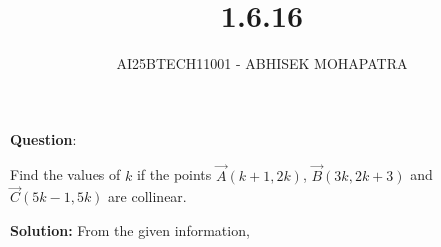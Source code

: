 \documentclass[journal,12pt,onecolumn]{IEEEtran}
\begin{document}
\title{1.6.16}
\author{AI25BTECH11001 - ABHISEK MOHAPATRA}
{\let\newpage\relax\maketitle}
		\textbf{Question}:

		\noindent Find the values of $k$ if the points $\vec{A}(k +1,2k)$, $\vec{B}(3k, 2k +3)$ and $\vec{C}(5k-1,5k)$ are collinear.

		\textbf{Solution:} From the given information,
\end{document}
